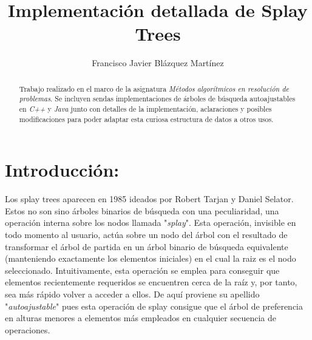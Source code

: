 \documentclass[letterpaper,12pt]{article}
\begin{document}
\title{\bf{Implementación detallada de Splay Trees}}
\author{Francisco Javier Blázquez Martínez}
\date{}
\maketitle

\begin{abstract}

Trabajo realizado en el marco de la asignatura \textit{Métodos algorítmicos 
en resolución de problemas}. Se incluyen sendas implementaciones de árboles 
de búsqueda autoajustables en \textit{C++} y \textit{Java} junto con detalles
de la implementación, aclaraciones y posibles modificaciones para poder 
adaptar esta curiosa estructura de datos a otros usos.

\end{abstract}

\section{Introducción:}

Los splay trees aparecen en 1985 ideados por Robert Tarjan y Daniel Selator.
Estos no son sino árboles binarios de búsqueda con una peculiaridad, una 
operación interna sobre los nodos llamada "\textit{splay}". Esta operación, 
invisible en todo momento al usuario, actúa sobre un nodo del árbol con el 
resultado de transformar el árbol de partida en un árbol binario de búsqueda 
equivalente (manteniendo exactamente los elementos iniciales) en el cual la 
raiz es el nodo seleccionado. Intuitivamente, esta operación se emplea para 
conseguir que elementos recientemente requeridos se encuentren cerca de la 
raíz y, por tanto, sea más rápido volver a acceder a ellos. De aquí proviene
su apellido "\textit{autoajustable}" pues esta operación de splay consigue 
que el árbol de preferencia en alturas menores a elementos más empleados en
cualquier secuencia de operaciones.
\end{document}
